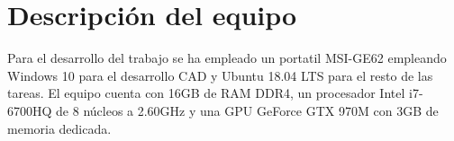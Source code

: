 \section{Descripción del equipo}
Para el desarrollo del trabajo se ha empleado un portatil MSI-GE62 empleando Windows 10 para el desarrollo CAD y Ubuntu 18.04 LTS para el resto de las tareas. El equipo cuenta con 16GB de RAM DDR4, un procesador Intel i7-6700HQ de 8 núcleos a 2.60GHz y una GPU GeForce GTX 970M con 3GB de memoria dedicada.

